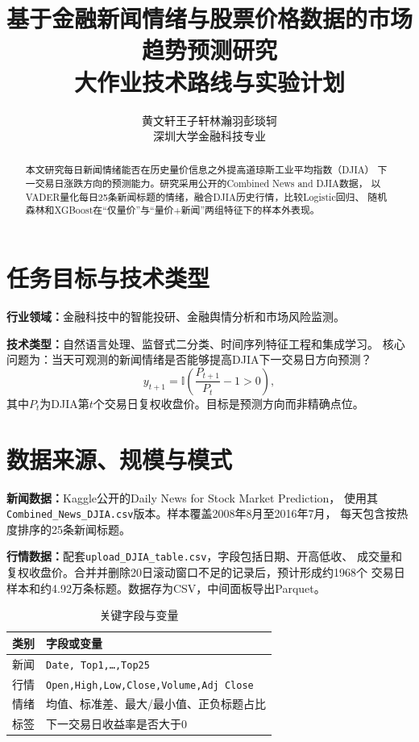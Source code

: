 \documentclass[UTF8,a4paper,10pt,fontset=none]{ctexart}
\title{\vspace{-1.1cm}\textbf{基于金融新闻情绪与股票价格数据的市场趋势预测研究}\\[-0.2em]
{\large 大作业技术路线与实验计划}}
\author{黄文轩\quad 王子轩\quad 林瀚羽\quad 彭琰轲\\深圳大学金融科技专业}
\date{}
\newcommand{\key}[1]{\textbf{#1}}
\begin{document}
\maketitle
\vspace{-1.6em}
\begin{abstract}
\noindent
本文研究每日新闻情绪能否在历史量价信息之外提高道琼斯工业平均指数（DJIA）
下一交易日涨跌方向的预测能力。研究采用公开的Combined News and DJIA数据，
以VADER量化每日25条新闻标题的情绪，融合DJIA历史行情，比较Logistic回归、
随机森林和XGBoost在“仅量价”与“量价+新闻”两组特征下的样本外表现。
\end{abstract}

\begin{multicols}{2}
\section{任务目标与技术类型}
\key{行业领域：}金融科技中的智能投研、金融舆情分析和市场风险监测。

\key{技术类型：}自然语言处理、监督式二分类、时间序列特征工程和集成学习。
核心问题为：当天可观测的新闻情绪是否能够提高DJIA下一交易日方向预测？
\begin{equation}
y_{t+1}=\mathbb{I}\left(\frac{P_{t+1}}{P_t}-1>0\right),
\end{equation}
其中$P_t$为DJIA第$t$个交易日复权收盘价。目标是预测方向而非精确点位。

\section{数据来源、规模与模式}
\key{新闻数据：}Kaggle公开的Daily News for Stock Market Prediction，
使用其\texttt{Combined\_News\_DJIA.csv}版本。样本覆盖2008年8月至2016年7月，
每天包含按热度排序的25条新闻标题。

\key{行情数据：}配套\texttt{upload\_DJIA\_table.csv}，字段包括日期、开高低收、
成交量和复权收盘价。合并并删除20日滚动窗口不足的记录后，预计形成约1968个
交易日样本和约4.92万条标题。数据存为CSV，中间面板导出Parquet。

\begin{table}[H]
\centering\small
\caption{关键字段与变量}
\begin{tabularx}{\columnwidth}{p{1.25cm}Y}
\toprule
类别 & 字段或变量\\
\midrule
新闻 & \texttt{Date, Top1,\ldots,Top25}\\
行情 & \texttt{Open,High,Low,Close,Volume,Adj Close}\\
情绪 & 均值、标准差、最大/最小值、正负标题占比\\
标签 & 下一交易日收益率是否大于0\\
\bottomrule
\end{tabularx}
\end{table}


\end{multicols}
\end{document}
